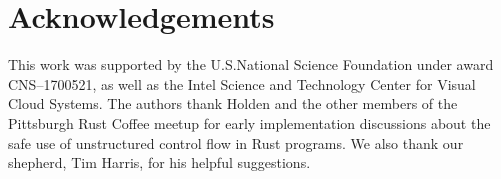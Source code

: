 \section*{Acknowledgements}

This work was supported by the U.S.\@ National Science Foundation under award
CNS--1700521, as well as the Intel Science and Technology Center for Visual Cloud
Systems.  The authors thank Holden and the other members of the
Pittsburgh Rust Coffee meetup for early implementation discussions about the safe use
of unstructured control flow in Rust programs.  We also thank our shepherd, Tim
Harris, for his helpful suggestions.
